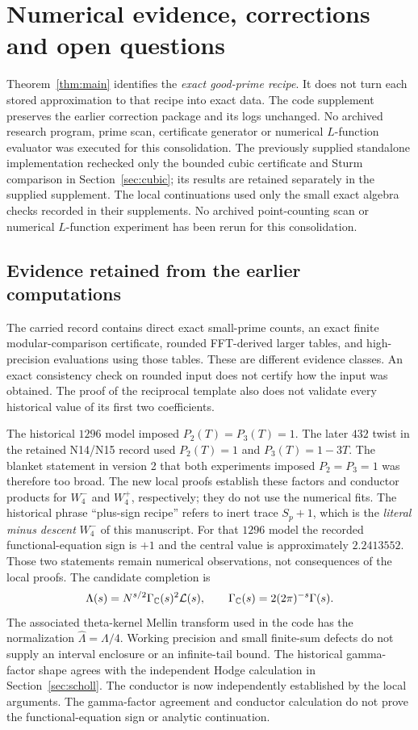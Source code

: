 \section{Numerical evidence, corrections and open questions}\label{sec:limits}
Theorem~\ref{thm:main} identifies the \emph{exact good-prime recipe}.
It does not turn each stored approximation to that recipe into exact data.
The code supplement preserves the earlier correction package and its logs
unchanged. No archived research program, prime scan, certificate generator
or numerical $L$-function evaluator was executed for this consolidation.
The previously supplied standalone implementation rechecked only the
bounded cubic certificate and Sturm comparison in Section~\ref{sec:cubic};
its results are retained separately in the supplied supplement. The local continuations used only the small exact algebra checks recorded
in their supplements. No archived point-counting scan or numerical
$L$-function experiment has been rerun for this consolidation.

\subsection{Evidence retained from the earlier computations}
The carried record contains direct exact small-prime counts, an exact
finite modular-comparison certificate, rounded FFT-derived larger tables,
and high-precision evaluations using those tables. These are different
evidence classes. An exact consistency check on rounded input does not
certify how the input was obtained. The proof of the reciprocal template
also does not validate every historical value of its first two coefficients.

The historical $1296$ model imposed $P_2(T)=P_3(T)=1$.
The later $432$ twist in the retained N14/N15 record used
$P_2(T)=1$ and $P_3(T)=1-3T$. The blanket statement in version 2
that both experiments imposed $P_2=P_3=1$ was therefore too broad.
The new local proofs establish these factors and conductor products for
$W_4^-$ and $W_4^+$, respectively; they do not use the numerical fits.
The historical phrase ``plus-sign recipe'' refers to inert trace $S_p+1$,
which is the \emph{literal minus descent} $W_4^-$ of this manuscript.
For that $1296$ model the recorded functional-equation sign is $+1$
and the central value is approximately $2.2413552$. Those two statements
remain numerical observations, not consequences of the local proofs.
The candidate completion is
\[
 \Lambda(s)=N^{s/2}\Gamma_{\mathbb C}(s)^2\mathcal L(s),\qquad
 \Gamma_{\mathbb C}(s)=2(2\pi)^{-s}\Gamma(s).
\]
The associated theta-kernel Mellin transform used in the code has the
normalization $\widehat\Lambda=\Lambda/4$. Working precision and small
finite-sum defects do not supply an interval enclosure or an infinite-tail
bound. The historical gamma-factor shape agrees with the independent Hodge
calculation in Section~\ref{sec:scholl}. The conductor is now independently established by the local arguments.
The gamma-factor agreement and conductor calculation do not prove the
functional-equation sign or analytic continuation.


